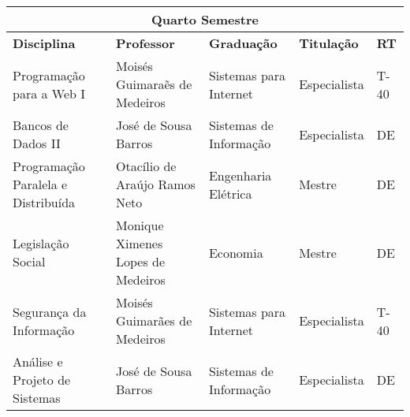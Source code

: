 \begin{table}[h!]
\scriptsize
\begin{tabular}{lllll}
\multicolumn{5}{c}{\cellcolor[HTML]{C0C0C0}\textbf{Quarto Semestre}}                                                                                                                                                                                                                                    \\ \hline
\multicolumn{1}{|p{5.2cm}|}{\cellcolor[HTML]{FFFFFF}\textbf{Disciplina}}                                    & \multicolumn{1}{p{5.2cm}|}{\textbf{Professor}}                 & \multicolumn{1}{p{3.1cm}|}{\textbf{Graduação}}     & \multicolumn{1}{p{1.7cm}|}{\textbf{Titulação}} & \multicolumn{1}{p{0.6cm}|}{\textbf{RT}} \\ \hline
\multicolumn{1}{|l|}{Programa\c{c}\~ao para a Web I}                                                            & \multicolumn{1}{l|}{Mois\'es Guimara\~es de Medeiros}             & \multicolumn{1}{l|}{Sistemas para Internet}          & \multicolumn{1}{l|}{Especialista}             & \multicolumn{1}{l|}{T-40}                          \\ \hline
\multicolumn{1}{|l|}{Bancos de Dados II} & \multicolumn{1}{l|}{Jos\'e de Sousa Barros}        & \multicolumn{1}{l|}{Sistemas de Informa\c{c}\~ao}             & \multicolumn{1}{l|}{Especialista}             & \multicolumn{1}{l|}{DE}                          \\ \hline
\multicolumn{1}{|l|}{\cellcolor[HTML]{FFFFFF}Programa\c{c}\~ao Paralela e Distribu\'ida}                         & \multicolumn{1}{l|}{Otac\'ilio de Ara\'ujo Ramos Neto}   & \multicolumn{1}{l|}{Engenharia El\'etrica}             & \multicolumn{1}{l|}{Mestre}             & \multicolumn{1}{l|}{DE}                        \\ \hline
\multicolumn{1}{|l|}{Legislação Social}                                             & \multicolumn{1}{l|}{Monique Ximenes Lopes de Medeiros}                 & \multicolumn{1}{l|}{Economia}  & \multicolumn{1}{l|}{Mestre}             & \multicolumn{1}{l|}{DE}                          \\ \hline
\multicolumn{1}{|l|}{Seguran\c{c}a da Informa\c{c}\~ao}                                                      & \multicolumn{1}{l|}{Mois\'es Guimar\~aes de Medeiros} & \multicolumn{1}{l|}{Sistemas para Internet}  & \multicolumn{1}{l|}{Especialista}             & \multicolumn{1}{l|}{T-40}                          \\ \hline
\multicolumn{1}{|l|}{An\'alise e Projeto de Sistemas}                                                         & \multicolumn{1}{l|}{Jos\'e de Sousa Barros}       & \multicolumn{1}{l|}{Sistemas de Informa\c{c}\~ao} & \multicolumn{1}{l|}{Especialista}       & \multicolumn{1}{l|}{DE}                        \\ \hline
\end{tabular}
\end{table}


